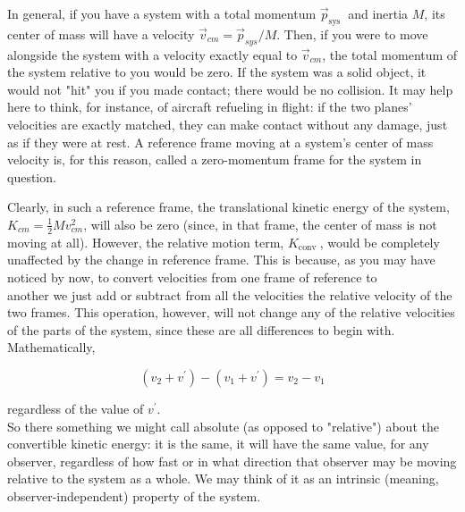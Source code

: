\documentclass[10pt]{article}
\begin{document}
In general, if you have a system with a total momentum $\vec{p}_{\text {sys }}$ and inertia $M$, its center of mass will have a velocity $\vec{v}_{c m}=\vec{p}_{s y s} / M$. Then, if you were to move alongside the system with a velocity exactly equal to $\vec{v}_{c m}$, the total momentum of the system relative to you would be zero. If the system was a solid object, it would not "hit" you if you made contact; there would be no collision. It may help here to think, for instance, of aircraft refueling in flight: if the two planes' velocities are exactly matched, they can make contact without any damage, just as if they were at rest. A reference frame moving at a system's center of mass velocity is, for this reason, called a zero-momentum frame for the system in question.

Clearly, in such a reference frame, the translational kinetic energy of the system, $K_{c m}=\frac{1}{2} M v_{c m}^{2}$, will also be zero (since, in that frame, the center of mass is not moving at all). However, the relative motion term, $K_{\text {conv }}$, would be completely unaffected by the change in reference frame. This is because, as you may have noticed by now, to convert velocities from one frame of reference to\\
another we just add or subtract from all the velocities the relative velocity of the two frames. This operation, however, will not change any of the relative velocities of the parts of the system, since these are all differences to begin with. Mathematically,

$$
\left(v_{2}+v^{\prime}\right)-\left(v_{1}+v^{\prime}\right)=v_{2}-v_{1}
$$

regardless of the value of $v^{\prime}$.\\
So there something we might call absolute (as opposed to "relative") about the convertible kinetic energy: it is the same, it will have the same value, for any observer, regardless of how fast or in what direction that observer may be moving relative to the system as a whole. We may think of it as an intrinsic (meaning, observer-independent) property of the system.
\end{document}
